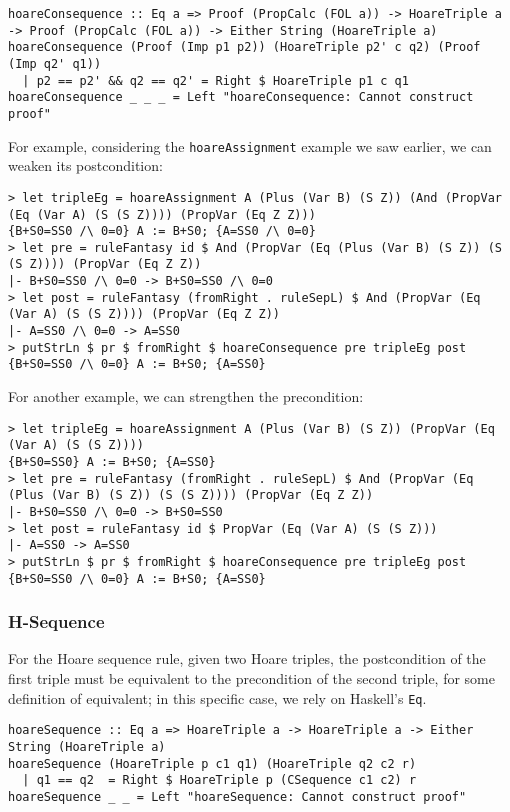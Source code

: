 \documentclass{article}
\begin{document}
\begin{lstlisting}
hoareConsequence :: Eq a => Proof (PropCalc (FOL a)) -> HoareTriple a -> Proof (PropCalc (FOL a)) -> Either String (HoareTriple a)
hoareConsequence (Proof (Imp p1 p2)) (HoareTriple p2' c q2) (Proof (Imp q2' q1))
  | p2 == p2' && q2 == q2' = Right $ HoareTriple p1 c q1
hoareConsequence _ _ _ = Left "hoareConsequence: Cannot construct proof"
\end{lstlisting}

For example, considering the \texttt{hoareAssignment} example we saw earlier, we can weaken its postcondition:

\begin{lstlisting}
> let tripleEg = hoareAssignment A (Plus (Var B) (S Z)) (And (PropVar (Eq (Var A) (S (S Z)))) (PropVar (Eq Z Z)))
{B+S0=SS0 /\ 0=0} A := B+S0; {A=SS0 /\ 0=0}
> let pre = ruleFantasy id $ And (PropVar (Eq (Plus (Var B) (S Z)) (S (S Z)))) (PropVar (Eq Z Z))
|- B+S0=SS0 /\ 0=0 -> B+S0=SS0 /\ 0=0
> let post = ruleFantasy (fromRight . ruleSepL) $ And (PropVar (Eq (Var A) (S (S Z)))) (PropVar (Eq Z Z))
|- A=SS0 /\ 0=0 -> A=SS0
> putStrLn $ pr $ fromRight $ hoareConsequence pre tripleEg post
{B+S0=SS0 /\ 0=0} A := B+S0; {A=SS0}
\end{lstlisting}

For another example, we can strengthen the precondition:

\begin{lstlisting}
> let tripleEg = hoareAssignment A (Plus (Var B) (S Z)) (PropVar (Eq (Var A) (S (S Z))))
{B+S0=SS0} A := B+S0; {A=SS0}
> let pre = ruleFantasy (fromRight . ruleSepL) $ And (PropVar (Eq (Plus (Var B) (S Z)) (S (S Z)))) (PropVar (Eq Z Z))
|- B+S0=SS0 /\ 0=0 -> B+S0=SS0
> let post = ruleFantasy id $ PropVar (Eq (Var A) (S (S Z)))
|- A=SS0 -> A=SS0
> putStrLn $ pr $ fromRight $ hoareConsequence pre tripleEg post
{B+S0=SS0 /\ 0=0} A := B+S0; {A=SS0}
\end{lstlisting}

\subsubsection{H-Sequence}

For the Hoare sequence rule, given two Hoare triples, the postcondition of the first triple must be equivalent to the precondition of the second triple, for some definition of equivalent; in this specific case, we rely on Haskell's \texttt{Eq}.

\begin{lstlisting}
hoareSequence :: Eq a => HoareTriple a -> HoareTriple a -> Either String (HoareTriple a)
hoareSequence (HoareTriple p c1 q1) (HoareTriple q2 c2 r)
  | q1 == q2  = Right $ HoareTriple p (CSequence c1 c2) r
hoareSequence _ _ = Left "hoareSequence: Cannot construct proof"
\end{lstlisting}
\end{document}
